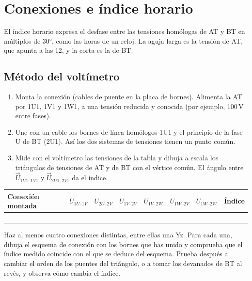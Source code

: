 \documentclass[11pt,a4paper]{article}
\begin{document}
\section{Conexiones e índice horario}
El índice horario expresa el desfase entre las tensiones homólogas de AT y BT en múltiplos de 30°, como las horas de un reloj. La aguja larga es la tensión de AT, que apunta a las 12, y la corta es la de BT.

\subsection*{Método del voltímetro}
\begin{enumerate}
  \item Monta la conexión (cables de puente en la placa de bornes). Alimenta la AT por 1U1, 1V1 y 1W1, a una tensión reducida y conocida (por ejemplo, 100\,V entre fases).
  \item Une con un cable los bornes de línea homólogos 1U1 y el principio de la fase U de BT (2U1). Así los dos sistemas de tensiones tienen un punto común.
  \item Mide con el voltímetro las tensiones de la tabla y dibuja a escala los triángulos de tensiones de AT y de BT con el vértice común. El ángulo entre $\vec U_{1U1\text{–}1V1}$ y $\vec U_{2U1\text{–}2V1}$ da el índice.
\end{enumerate}

\begin{tabularx}{\textwidth}{|l|C|C|C|C|C|C|C|}
  \hline
  Conexión montada & $U_{1U\text{–}1V}$ & $U_{2U\text{–}2V}$ & $U_{1V\text{–}2V}$ & $U_{1V\text{–}2W}$ & $U_{1W\text{–}2V}$ & $U_{1W\text{–}2W}$ & Índice \\ \hline
  & & & & & & & \\[5pt] \hline
  & & & & & & & \\[5pt] \hline
  & & & & & & & \\[5pt] \hline
  & & & & & & & \\[5pt] \hline
\end{tabularx}

Haz al menos cuatro conexiones distintas, entre ellas una Yz. Para cada una, dibuja el esquema de conexión con los bornes que has unido y comprueba que el índice medido coincide con el que se deduce del esquema. Prueba después a cambiar el orden de los puentes del triángulo, o a tomar los devanados de BT al revés, y observa cómo cambia el índice.
\end{document}

